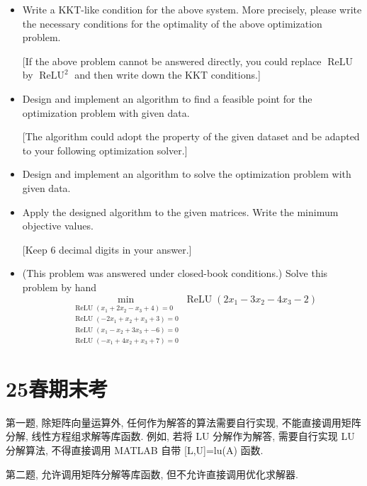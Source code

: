 \begin{enumerate}
\begin{itemize}
    \item[(1) (10 pt)] Write a KKT-like condition for the above system. More precisely, please write the necessary conditions for the optimality of the above optimization problem.

    [If the above problem cannot be answered directly, you could replace $\operatorname{ReLU}$ by $\operatorname{ReLU}^2$ and then write down the KKT conditions.]

    \item[(2) (10 pt)] Design and implement an algorithm to find a feasible point for the optimization problem with given data.

    [The algorithm could adopt the property of the given dataset and be adapted to your following optimization solver.]

    \item[(3) (10 pt)] Design and implement an algorithm to solve the optimization problem with given data.

    \item[(4) (10 pt)] Apply the designed algorithm to the given matrices. Write the minimum objective values.

    [Keep 6 decimal digits in your answer.]

    \item[(5) (10 pt)] (This problem was answered under closed-book conditions.) 
    Solve this problem by hand
    \[
    \min_{
    \substack{
    \operatorname{ReLU}(x_1 +2x_2 - x_3 + 4)=0\\
    \operatorname{ReLU}(-2x_1 +x_2 + x_3 + 3)=0\\
    \operatorname{ReLU}(x_1 - x_2 + 3x_3 + -6)=0\\
    \operatorname{ReLU}(-x_1 +4x_2 + x_3 + 7)=0
    }
    }
    \operatorname{ReLU}(2x_1 -3 x_2 -4 x_3 -2)
\]

\end{itemize}
\end{enumerate}

\section{25春期末考}
第一题, 除矩阵向量运算外, 任何作为解答的算法需要自行实现, 不能直接调用矩阵分解, 线性方程组求解等库函数. 例如, 若将 LU 分解作为解答, 需要自行实现 LU 分解算法, 不得直接调用 MATLAB 自带 [L,U]=lu(A) 函数. 

第二题, 允许调用矩阵分解等库函数, 但不允许直接调用优化求解器.

